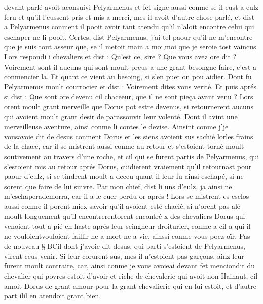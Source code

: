 \documentclass{article}
\begin{document}
\begin{pages}
      devant parlé avoit aconsuivi Pelyarmenus et fet 
   signe aussi conme se il eust a eulz feru et qu’il l’eussent pris et mis a merci, 
   mes il avoit d’autre chose parlé, et dist a Pelyarmenus 
   conment il pooit avoir tant atendu qu’il n’aloit encontre celui qui eschaper ne li pooit.
   Certes, dist Pelyarmenus, 
      j’ai tel paour qu’il ne m’encontre que je suis tout asseur que, se il metoit main a 
      moi,moi que 
      je seroie tost vaincus.
   Lors respondi i chevaliers et dist :
   Qu’est ce, sire ? Que
      vous avez ore dit ? 
      Voirement sont il aucuns qui sont moult preus a une grant besongne 
      faire, c’est a conmencier 
      la. 
      Et quant ce vient au besoing, si s’en puet on 
      pou aidier.
   Dont fu Pelyarmenus moult courrociez et dist :
   Voirement dites vous verité.
   Et puis aprés si dist :
   Que sont ore devenu cil chaceeur, que il ne sont pieça avant venu ?
   Lors orent moult grant merveille que Dorus pot estre devenus, si retournerent aucuns 
   qui avoient moult grant desir de parassouvir leur volenté. Dont il avint une merveilleuse aventure, 
   ainsi conme li contes le devise. \pend
\pstart Ainsint conme j’je vousavoie 
   dit de desus conment Dorus et les siens avoient sus sachié 
   lorles frains de la chace, car il se mistrent aussi conme 
   au retour et s’estoient torné moult soutivement au travers d’une roche, et cil qui se furent partis de 
   Pelyarmenus, qui s’estoient mis au retour aprés Dorus, 
   cuidierent vraiement qu’il retournast pour paour d’eulz, si se tindrent moult a deceu quant il leur fu ainsi eschapé, 
   si ne sorent que faire de lui suivre.
   Par mon chief, dist li uns d’eulz, 
      ja ainsi ne m’eschaperademorra, car il a le cuer perdu or aprés !
   Lors se mistrent es esclos aussi conme il porent miex savoir qu’il avoient esté chacié, si n’orent pas alé moult longuement 
   qu’il encontrerentorent encontré x des chevaliers 
   Dorus qui venoient tout a pié en haste aprés 
   leur seingneur droiturier, conme a cil a qui il ne 
   vouloientvouloient faillir ne a mort ne a vie,
   ainssi conme vous poez oïr. \pend
\pstart Pas de nouveau § BCil dont j’avoie dit desus, 
   qui parti s’estoient de 
   Pelyarmenus, virent ceus venir. Si leur corurent sus, mes il n’estoient pas garçons, 
   ainz leur furent moult contraire, car, ainsi conme je vous 
      avoieai devant 
      fet menciondit du chevalier qui povres 
   estoit d’avoir et riche de chevalerie qui avoit non 
   Hainaut, cil amoit Dorus de grant amour pour la grant 
   chevalierie qui en lui estoit, et d’autre part ilil en atendoit grant bien. 

\end{pages}
\end{document}
